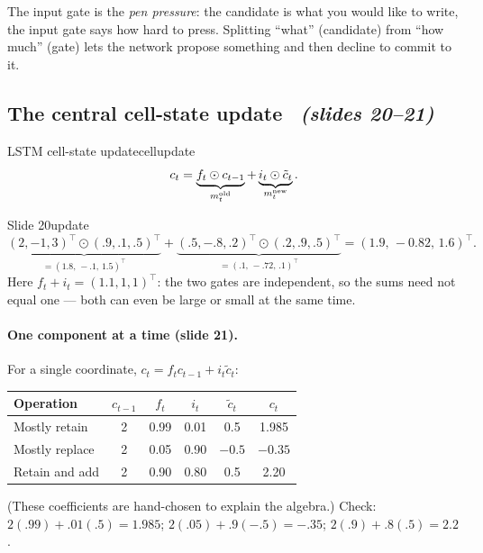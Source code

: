\documentclass[11pt,a4paper]{article}
\newcommand{\tc}{\tilde c}
\newcommand{\sltag}[1]{\texorpdfstring{\ \emph{(slides #1)}}{ (slides #1)}}
\begin{document}
\begin{intuition}
The input gate is the \emph{pen pressure}: the candidate is what you would like to write, the input gate says how hard to press. Splitting ``what'' (candidate) from ``how much'' (gate) lets the network propose something and then decline to commit to it.
\end{intuition}

\subsection{The central cell-state update \sltag{20--21}}

\begin{definition}{LSTM cell-state update}{cellupdate}
\[
c_t=\underbrace{f_t\odot c_{t-1}}_{m_t^{\rm old}}+\underbrace{i_t\odot\tc_t}_{m_t^{\rm new}} .
\]
\end{definition}

\begin{example}{Slide 20}{update}
\[
\underbrace{(2,-1,3)^\top\odot(.9,.1,.5)^\top}_{=(1.8,\,-.1,\,1.5)^\top}+\underbrace{(.5,-.8,.2)^\top\odot(.2,.9,.5)^\top}_{=(.1,\,-.72,\,.1)^\top}=(1.9,\,-0.82,\,1.6)^\top .
\]
Here $f_t+i_t=(1.1,1,1)^\top$: the two gates are independent, so the sums need not equal one --- both can even be large or small at the same time.
\end{example}

\paragraph{One component at a time (slide 21).} For a single coordinate, $c_t=f_tc_{t-1}+i_t\tc_t$:
\begin{center}
\begin{tabular}{lccccc}\toprule
Operation & $c_{t-1}$ & $f_t$ & $i_t$ & $\tc_t$ & $c_t$\\ \midrule
Mostly retain & 2 & 0.99 & 0.01 & 0.5 & 1.985\\
Mostly replace & 2 & 0.05 & 0.90 & $-0.5$ & $-0.35$\\
Retain and add & 2 & 0.90 & 0.80 & 0.5 & 2.20\\ \bottomrule
\end{tabular}
\end{center}
(These coefficients are hand-chosen to explain the algebra.) Check: $2(.99)+.01(.5)=1.985$; $2(.05)+.9(-.5)=-.35$; $2(.9)+.8(.5)=2.2$.
\end{document}
